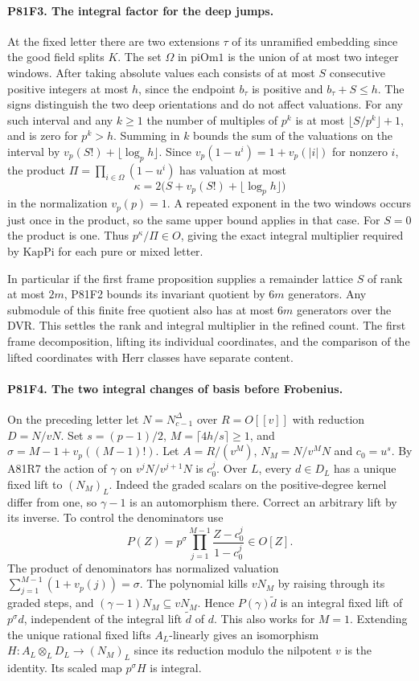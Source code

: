 \paragraph{P81F3. The integral factor for the deep jumps.}
At the fixed letter there are two extensions $\tau$ of its
unramified embedding since the good field splits $K$.
The set $\Omega$ in $\mathrm{piOm1}$ is the union of at most
two integer windows. After taking absolute values each consists
of at most $S$ consecutive positive integers at most $h$, since
the endpoint $b_\tau$ is positive and $b_\tau+S\le h$.
The signs distinguish the two deep orientations and do not
affect valuations. For any such interval and any $k\ge1$
the number of multiples of $p^k$ is at most
$\lfloor S/p^k\rfloor+1$, and is zero for $p^k>h$.
Summing in $k$ bounds the sum of the valuations on the interval
by $v_p(S!)+\lfloor\log_p h\rfloor$. Since
$v_p(1-u^i)=1+v_p(|i|)$ for nonzero $i$, the product
$\Pi=\prod_{i\in\Omega}(1-u^i)$ has valuation at most
\[
            \kappa=2\big(S+v_p(S!)+\lfloor\log_p h\rfloor\big)
\]
in the normalization $v_p(p)=1$. A repeated exponent in the two
windows occurs just once in the product, so the same upper
bound applies in that case. For $S=0$ the product is one.
Thus $p^\kappa/\Pi\in O$, giving the exact integral multiplier
required by $\mathrm{KapPi}$ for each pure or mixed letter.

In particular if the first frame proposition supplies a remainder
lattice $S$ of rank at most $2m$, P81F2 bounds its invariant
quotient by $6m$ generators. Any submodule of this finite free
quotient also has at most $6m$ generators over the DVR. This
settles the rank and integral multiplier in the refined count.
The first frame decomposition, lifting its individual coordinates,
and the comparison of the lifted coordinates with Herr classes
have separate content.

\paragraph{P81F4. The two integral changes of basis before Frobenius.}
On the preceding letter let $N=N_{c-1}^\Delta$ over $R=O[[v]]$
with reduction $D=N/vN$. Set $s=(p-1)/2$,
$M=\lceil4h/s\rceil\ge1$, and $\sigma=M-1+v_p((M-1)!)$.
Let $A=R/(v^M)$, $N_M=N/v^MN$ and $c_0=u^s$.
By A81R7 the action of $\gamma$ on $v^jN/v^{j+1}N$ is $c_0^j$.
Over $L$, every $d\in D_L$ has a unique fixed lift to $(N_M)_L$.
Indeed the graded scalars on the positive-degree kernel differ
from one, so $\gamma-1$ is an automorphism there. Correct an
arbitrary lift by its inverse. To control the denominators use
\[
 P(Z)=p^\sigma\prod_{j=1}^{M-1}\frac{Z-c_0^j}{1-c_0^j}\in O[Z].
\]
The product of denominators has normalized valuation
$\sum_{j=1}^{M-1}(1+v_p(j))=\sigma$.
The polynomial kills $v N_M$ by raising through its graded
steps, and $(\gamma-1)N_M\subseteq vN_M$. Hence
$P(\gamma)\widetilde d$ is an integral fixed lift of $p^\sigma d$,
independent of the integral lift $\widetilde d$ of $d$. This
also works for $M=1$. Extending the unique rational fixed lifts
$A_L$-linearly gives an isomorphism
$H:A_L\otimes_L D_L\longrightarrow (N_M)_L$ since its reduction
modulo the nilpotent $v$ is the identity. Its scaled map
$p^\sigma H$ is integral.


